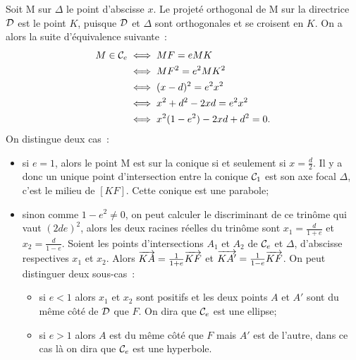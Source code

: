 Soit M sur \(\Delta\) le point d'abscisse \(x\). Le projeté orthogonal de M sur 
la directrice \(\mathcal{D}\) est le point \(K\), puisque \(\mathcal{D}\) et \(\Delta\) sont 
orthogonales et se croisent en \(K\). On a alors la suite d'équivalence 
suivante~:
\begin{align}
  M \in \mathcal{C}_{e} &\iff MF = e MK \\
                &\iff MF^2 = e^2 MK^2 \\
                &\iff (x-d)^2 = e^2 x^2\\
                &\iff x^2 + d^2-2xd = e^2 x^2\\
                &\iff x^2(1-e^2)-2xd + d^2 = 0.
\end{align}
On distingue deux cas~:
\begin{itemize}
  \item si \(e = 1\), alors le point M est sur la conique si et seulement si 
    \(x = \frac{d}{2}\). Il y a donc un unique point d'intersection entre la 
    conique \(\mathcal{C}_{1}\) est son axe focal \(\Delta\), c'est le milieu de 
    \([KF]\). Cette conique est une parabole;
  \item sinon comme \(1-e^2 \neq 0\), on peut calculer le discriminant de ce 
    trinôme qui vaut \((2de)^2\), alors les deux racines réelles du trinôme sont 
    \(x_1 = \frac{d}{1 + e}\) et \(x_2 = \frac{d}{1-e}\). Soient les points 
    d'intersections \(A_1\) et \(A_2\) de \(\mathcal{C}_{e}\) et \(\Delta\), d'abscisse 
    respectives \(x_1\) et \(x_2\). Alors \(\overrightarrow{KA} = \frac{1}{1 + e} \overrightarrow{KF}\) 
    et \(\overrightarrow{KA'} = \frac{1}{1-e} \overrightarrow{KF}\). On peut distinguer deux 
    sous-cas~:
    \begin{itemize}
      \item si \(e<1\) alors \(x_1\) et \(x_2\) sont positifs et les deux points 
        \(A\) et \(A'\) sont du même côté de \(\mathcal{D}\) que \(F\). On dira que 
        \(\mathcal{C}_{e}\) est une ellipse;
      \item si \(e>1\) alors \(A\) est du même côté que \(F\) mais \(A'\) est de 
        l'autre, dans ce cas là on dira que \(\mathcal{C}_{e}\) est une hyperbole.
    \end{itemize}
\end{itemize}


